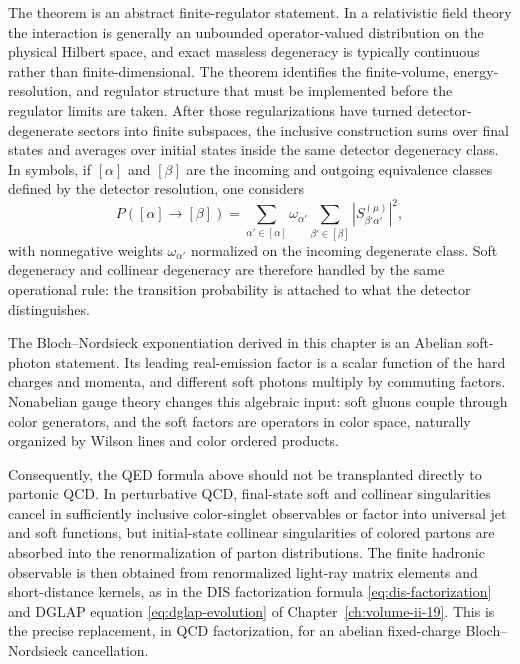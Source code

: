 The theorem is an abstract finite-regulator statement.  In a relativistic
field theory the interaction is generally an unbounded operator-valued
distribution on the physical Hilbert space, and exact massless degeneracy is
typically continuous rather than finite-dimensional.  The theorem identifies
the finite-volume, energy-resolution, and regulator structure that must be
implemented before the regulator limits are taken.  After those
regularizations have turned detector-degenerate sectors into finite
subspaces, the inclusive construction sums over final states and averages over
initial states inside the same detector degeneracy class.  In symbols, if
\([\alpha]\) and \([\beta]\) are the incoming and outgoing equivalence classes
defined by the detector resolution, one considers
\[
  P([\alpha]\to[\beta])
  =
  \sum_{\alpha'\in[\alpha]}\omega_{\alpha'}
  \sum_{\beta'\in[\beta]}
  \left|S^{(\mu)}_{\beta'\alpha'}\right|^2,
\]
with nonnegative weights \(\omega_{\alpha'}\) normalized on the incoming
degenerate class.  Soft degeneracy and collinear degeneracy are therefore
handled by the same operational rule: the transition probability is attached
to what the detector distinguishes.

\begin{remark}
\label{rem:abelian-scope-bloch-nordsieck}
The Bloch--Nordsieck exponentiation derived in this chapter is an Abelian
soft-photon statement.  Its leading real-emission factor is a scalar function
of the hard charges and momenta, and different soft photons multiply by
commuting factors.  Nonabelian gauge theory changes this algebraic input:
soft gluons couple through color generators, and the soft factors are
operators in color space, naturally organized by Wilson lines and color
ordered products.

Consequently, the QED formula above should not be transplanted directly to
partonic QCD.  In perturbative QCD, final-state soft and collinear
singularities cancel in sufficiently inclusive color-singlet observables or
factor into universal jet and soft functions, but initial-state collinear
singularities of colored partons are absorbed into the renormalization of
parton distributions.  The finite hadronic observable is then obtained from
renormalized light-ray matrix elements and short-distance kernels, as in the
DIS factorization formula
\eqref{eq:dis-factorization} and DGLAP equation
\eqref{eq:dglap-evolution} of
Chapter~\ref{ch:volume-ii-19}.  This is the precise replacement, in QCD
factorization, for an abelian fixed-charge Bloch--Nordsieck cancellation.
\end{remark}

